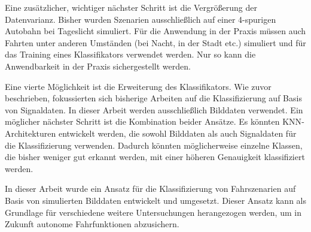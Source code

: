 Eine zusätzlicher, wichtiger nächster Schritt ist die Vergrößerung der Datenvarianz. Bisher wurden Szenarien ausschließlich auf einer 4-spurigen Autobahn bei Tageslicht simuliert. Für die Anwendung in der Praxis müssen auch Fahrten unter anderen Umständen (bei Nacht, in der Stadt etc.) simuliert und für das Training eines Klassifikators verwendet werden. Nur so kann die Anwendbarkeit in der Praxis sichergestellt werden.

Eine vierte Möglichkeit ist die Erweiterung des Klassifikators. Wie zuvor beschrieben, fokussierten sich bisherige Arbeiten auf die Klassifizierung auf Basis von Signaldaten. In dieser Arbeit werden ausschließlich Bilddaten verwendet. Ein möglicher nächster Schritt ist die Kombination beider Ansätze. Es könnten \ac{KNN}-Architekturen entwickelt werden, die sowohl Bilddaten als auch Signaldaten für die Klassifizierung verwenden. Dadurch könnten möglicherweise einzelne Klassen, die bisher weniger gut erkannt werden, mit einer höheren Genauigkeit klassifiziert werden.

In dieser Arbeit wurde ein Ansatz für die Klassifizierung von Fahrszenarien auf Basis von simulierten Bilddaten entwickelt und umgesetzt. Dieser Ansatz kann als Grundlage für verschiedene weitere Untersuchungen herangezogen werden, um in Zukunft autonome Fahrfunktionen abzusichern.





